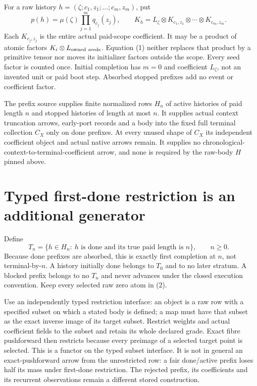 \documentclass[11pt]{article}\usepackage{amsmath,amssymb,amsthm,geometry}\geometry{margin=1in}\newtheorem{definition}{Definition}\newtheorem{theorem}[definition]{Theorem}\newtheorem{proposition}[definition]{Proposition}
\begin{document}
For a raw history $h=(\zeta;c_1,z_1;\ldots;c_m,z_m)$, put
\[
 p(h)=\mu(\zeta)\prod_{j=1}^m q_{c_j}(z_j),\qquad
 K_h=L_\zeta\otimes K_{c_1,z_1}\otimes\cdots\otimes K_{c_m,z_m}. \tag{1}
\]
Each $K_{c_j,z_j}$ is the entire actual paid-scope coefficient. It may be a product of atomic factors $K_i\otimes L_{\rm owned\ seeds}$. Equation (1) neither replaces that product by a primitive tensor nor moves its initializer factors outside the scope. Every seed factor is counted once. Initial completion has $m=0$ and coefficient $L_\zeta$, not an invented unit or paid boot step. Absorbed stopped prefixes add no event or coefficient factor.

The prefix source supplies finite normalized rows $H_n$ of active histories of paid length $n$ and stopped histories of length at most $n$. It supplies actual context truncation arrows, early-port records and a body into the fixed full terminal collection $C_X$ only on done prefixes. At every unused shape of $C_X$ its independent coefficient object and actual native arrows remain. It supplies no chronological-context-to-terminal-coefficient arrow, and none is required by the raw-body $H$ pinned above.

\section{Typed first-done restriction is an additional generator}
Define
\[
 T_n=\{h\in H_n:\ h\text{ is done and its true paid length is }n\},\qquad n\geq0. \tag{2}
\]
Because done prefixes are absorbed, this is exactly first completion at $n$, not terminal-by-$n$. A history initially done belongs to $T_0$ and to no later stratum. A blocked prefix belongs to no $T_n$ and never advances under the closed execution convention. Keep every selected raw zero atom in (2).

Use an independently typed restriction interface: an object is a raw row with a specified subset on which a stated body is defined; a map must have that subset as the exact inverse image of its target subset. Restrict weights and actual coefficient fields to the subset and retain its whole declared grade. Exact fibre pushforward then restricts because every preimage of a selected target point is selected. This is a functor on the typed subset interface. It is not in general an exact-pushforward arrow from the unrestricted row: a fair done/active prefix loses half its mass under first-done restriction. The rejected prefix, its coefficients and its recurrent observations remain a different stored construction.
\end{document}
